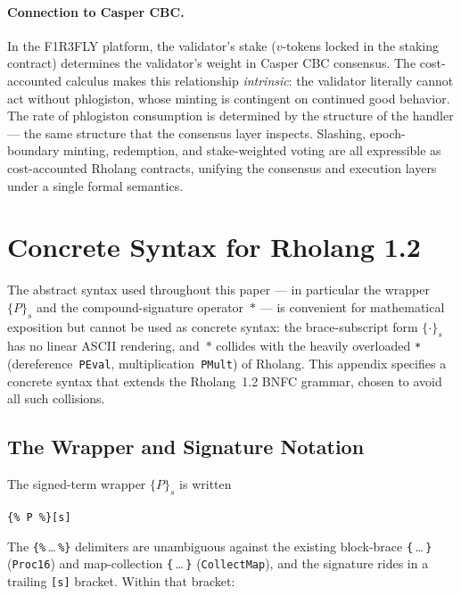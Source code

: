\documentclass[11pt,a4paper]{article}
\newcommand{\signed}[2]{\{#1\}_{#2}}
\newcommand{\comp}{\mathbin{*}}
\begin{document}
\paragraph{Connection to Casper CBC.}
In the F1R3FLY platform, the validator's stake
($v$-tokens locked in the staking contract) determines
the validator's weight in Casper CBC consensus.  The
cost-accounted calculus makes this relationship
\emph{intrinsic}: the validator literally cannot act
without phlogiston, whose minting is contingent on
continued good behavior.  The rate of phlogiston
consumption is determined by the structure of the
handler --- the same structure that the consensus layer
inspects.  Slashing, epoch-boundary minting, redemption,
and stake-weighted voting are all expressible as
cost-accounted Rholang contracts, unifying the consensus
and execution layers under a single formal semantics.

\section{Concrete Syntax for Rholang 1.2}
\label{app:concrete}

The abstract syntax used throughout this paper --- in particular
the wrapper $\signed{P}{s}$ and the compound-signature
operator~$\comp$ --- is convenient for mathematical exposition
but cannot be used as concrete syntax: the brace-subscript form
$\{\cdot\}_s$ has no linear ASCII rendering, and~$\comp$
collides with the heavily overloaded \texttt{*}
(dereference~\texttt{PEval}, multiplication~\texttt{PMult}) of
Rholang.  This appendix specifies a concrete syntax that
extends the Rholang~1.2 BNFC grammar, chosen to avoid all such
collisions.

\subsection{The Wrapper and Signature Notation}
\label{app:concrete-wrapper}

The signed-term wrapper $\signed{P}{s}$ is written
\begin{center}
  \verb|{% P %}[s]|
\end{center}
The \verb|{%|\,\ldots\,\verb|%}| delimiters are unambiguous
against the existing block-brace \verb|{|\,\ldots\,\verb|}|
(\texttt{Proc16}) and map-collection
\verb|{|\,\ldots\,\verb|}| (\texttt{CollectMap}), and the
signature rides in a trailing \verb|[s]| bracket.  Within that
bracket:
\end{document}
